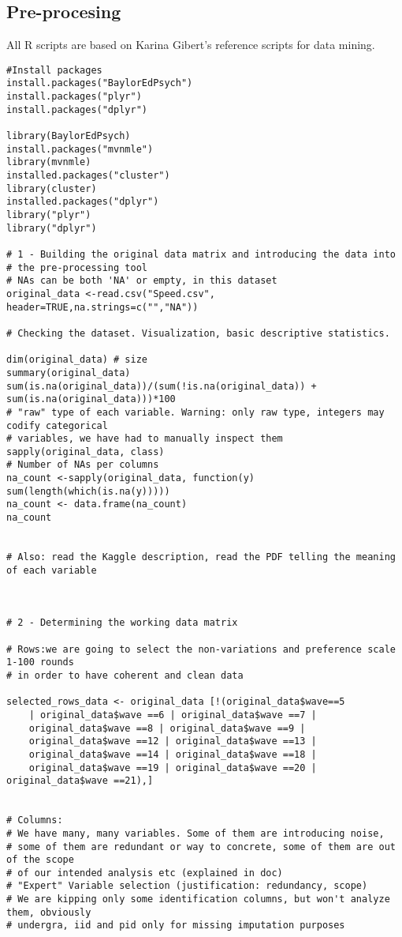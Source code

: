 
\subsection{Pre-procesing}

All R scripts are based on Karina Gibert's reference scripts for data mining.

\setlength\LTleft{-2cm}\begin{verbatim}
#Install packages
install.packages("BaylorEdPsych")
install.packages("plyr")
install.packages("dplyr")

library(BaylorEdPsych)
install.packages("mvnmle")
library(mvnmle)
installed.packages("cluster")
library(cluster)
installed.packages("dplyr")
library("plyr")
library("dplyr")

# 1 - Building the original data matrix and introducing the data into
# the pre-processing tool
# NAs can be both 'NA' or empty, in this dataset
original_data <-read.csv("Speed.csv", header=TRUE,na.strings=c("","NA"))

# Checking the dataset. Visualization, basic descriptive statistics.

dim(original_data) # size
summary(original_data)
sum(is.na(original_data))/(sum(!is.na(original_data)) + sum(is.na(original_data)))*100
# "raw" type of each variable. Warning: only raw type, integers may codify categorical
# variables, we have had to manually inspect them
sapply(original_data, class) 
# Number of NAs per columns
na_count <-sapply(original_data, function(y) sum(length(which(is.na(y)))))
na_count <- data.frame(na_count)
na_count


# Also: read the Kaggle description, read the PDF telling the meaning of each variable



# 2 - Determining the working data matrix

# Rows:we are going to select the non-variations and preference scale 1-100 rounds
# in order to have coherent and clean data

selected_rows_data <- original_data [!(original_data$wave==5
    | original_data$wave ==6 | original_data$wave ==7 |
    original_data$wave ==8 | original_data$wave ==9 | 
    original_data$wave ==12 | original_data$wave ==13 | 
    original_data$wave ==14 | original_data$wave ==18 |
    original_data$wave ==19 | original_data$wave ==20 | original_data$wave ==21),]


# Columns:
# We have many, many variables. Some of them are introducing noise,
# some of them are redundant or way to concrete, some of them are out of the scope
# of our intended analysis etc (explained in doc)
# "Expert" Variable selection (justification: redundancy, scope)
# We are kipping only some identification columns, but won't analyze them, obviously
# undergra, iid and pid only for missing imputation purposes


\end{verbatim}
